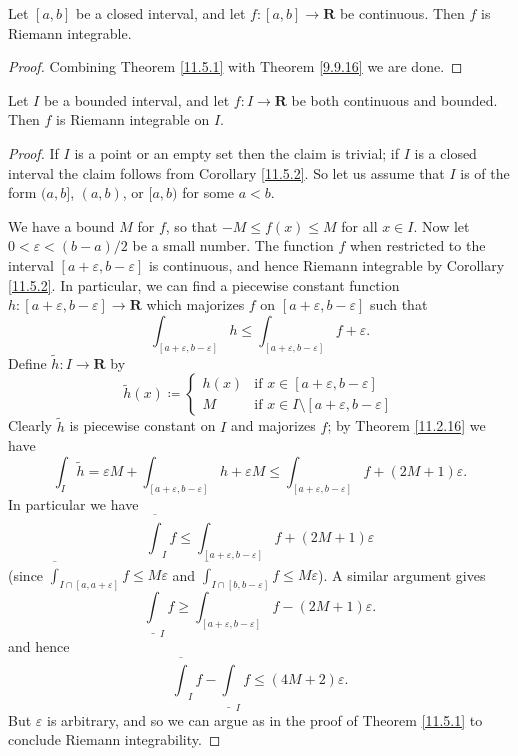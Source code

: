 \begin{corollary}\label{11.5.2}
    Let \([a, b]\) be a closed interval, and let \(f : [a, b] \to \mathbf{R}\) be continuous.
    Then \(f\) is Riemann integrable.
\end{corollary}

\begin{proof}
    Combining Theorem \ref{11.5.1} with Theorem \ref{9.9.16} we are done.
\end{proof}

\begin{proposition}\label{11.5.3}
    Let \(I\) be a bounded interval, and let \(f : I \to \mathbf{R}\) be both continuous and bounded.
    Then \(f\) is Riemann integrable on \(I\).
\end{proposition}

\begin{proof}
    If \(I\) is a point or an empty set then the claim is trivial;
    if \(I\) is a closed interval the claim follows from Corollary \ref{11.5.2}.
    So let us assume that \(I\) is of the form \((a, b]\), \((a, b)\), or \([a, b)\) for some \(a < b\).

    We have a bound \(M\) for \(f\), so that \(-M \leq f(x) \leq M\) for all \(x \in I\).
    Now let \(0 < \varepsilon < (b - a) / 2\) be a small number.
    The function \(f\) when restricted to the interval \([a + \varepsilon, b - \varepsilon]\) is continuous, and hence Riemann integrable by Corollary \ref{11.5.2}.
    In particular, we can find a piecewise constant function \(h : [a + \varepsilon, b - \varepsilon] \to \mathbf{R}\) which majorizes \(f\) on \([a + \varepsilon, b - \varepsilon]\) such that
    \[
        \int_{[a + \varepsilon, b - \varepsilon]} h \leq \int_{[a + \varepsilon, b - \varepsilon]} f + \varepsilon.
    \]
    Define \(\tilde{h} : I \to \mathbf{R}\) by
    \[
        \tilde{h}(x) \coloneqq \begin{cases}
            h(x) & \text{if } x \in [a + \varepsilon, b - \varepsilon]             \\
            M    & \text{if } x \in I \setminus [a + \varepsilon, b - \varepsilon]
        \end{cases}
    \]
    Clearly \(\tilde{h}\) is piecewise constant on \(I\) and majorizes \(f\);
    by Theorem \ref{11.2.16} we have
    \[
        \int_I \tilde{h} = \varepsilon M + \int_{[a + \varepsilon, b - \varepsilon]} h + \varepsilon M \leq \int_{[a + \varepsilon, b - \varepsilon]} f + (2M + 1) \varepsilon.
    \]
    In particular we have
    \[
        \overline{\int}_I f \leq \int_{[a + \varepsilon, b - \varepsilon]} f + (2M + 1) \varepsilon
    \]
    (since \(\overline{\int}_{I \cap [a, a + \varepsilon]} f \leq M \varepsilon\) and \(\overline{\int}_{I \cap [b, b - \varepsilon]} f \leq M \varepsilon\)).
    A similar argument gives
    \[
        \underline{\int}_I f \geq \int_{[a + \varepsilon, b - \varepsilon]} f - (2M + 1) \varepsilon.
    \]
    and hence
    \[
        \overline{\int}_I f - \underline{\int}_I f \leq (4M + 2) \varepsilon.
    \]
    But \(\varepsilon\) is arbitrary, and so we can argue as in the proof of Theorem \ref{11.5.1} to conclude Riemann integrability.
\end{proof}

